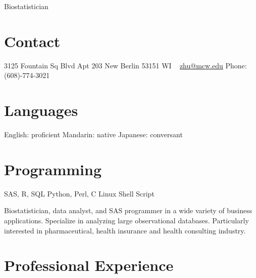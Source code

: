\documentclass[10pt, print]{friggeri-cv}
\begin{document}
       {Biostatistician}

\begin{aside}
  \section{Contact}
    3125 Fountain Sq Blvd
    Apt 203
    New Berlin
    53151 WI
    ~
    \href{mailto:zhu@mcw.edu}{zhu@mcw.edu}
    Phone: (608)-774-3021
  \section{Languages}
    English: proficient
    Mandarin: native
    Japanese: conversant
  \section{Programming}
    SAS, R, SQL
    Python, Perl, C
    Linux Shell Script
\end{aside}

Biostatistician, data analyst, and SAS programmer in a wide variety of business applications. Specialize in analyzing large observational databases. Particularly interested in pharmaceutical, health insurance and health consulting industry.\\

\section{Professional Experience}
\end{document}
